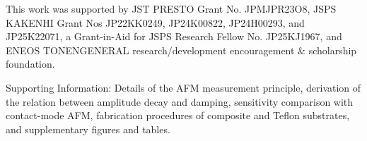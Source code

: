 \documentclass[journal=jacsat,manuscript=article]{achemso}
\begin{document}
\begin{acknowledgement}

This work was supported by JST PRESTO Grant No. JPMJPR23O8, JSPS KAKENHI Grant Nos JP22KK0249, JP24K00822, JP24H00293, and JP25K22071, a Grant-in-Aid for JSPS Research Fellow No. JP25KJ1967, and ENEOS TONENGENERAL research/development encouragement \& scholarship foundation. 

\end{acknowledgement}

\begin{suppinfo}

Supporting Information: Details of the AFM measurement principle, derivation of the relation between amplitude decay and damping, sensitivity comparison with contact-mode AFM, fabrication procedures of composite and Teflon substrates, and supplementary figures and tables.

\end{suppinfo}


\end{document}
